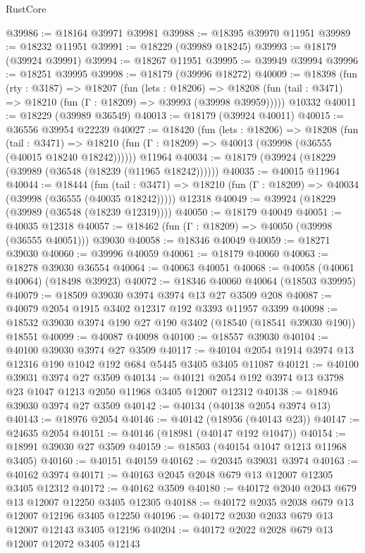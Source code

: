 \begin{lexlean}{RustCore}
\begin{coremodule}
@39986 := @18164 @39971 @39981
@39988 := @18395 @39970 @11951
@39989 := @18232 @11951
@39991 := @18229 (@39989 @18245)
@39993 := @18179 (@39924 @39991)
@39994 := @18267 @11951
@39995 := @39949 @39994
@39996 := @18251 @39995
@39998 := @18179 (@39996 @18272)
@40009 := @18398
    (fun (rty : @3187) =>
    @18207
      (fun (lets : @18206) =>
      @18208 (fun (tail : @3471) => @18210 (fun (Γ : @18209) => @39993 (@39998 @39959)))))
    @10332
@40011 := @18229 (@39989 @36549)
@40013 := @18179 (@39924 @40011)
@40015 := @36556 @39954 @22239
@40027 := @18420
    (fun (lets : @18206) =>
    @18208
      (fun (tail : @3471) =>
      @18210 (fun (Γ : @18209) => @40013 (@39998 (@36555 (@40015 @18240 @18242))))))
    @11964
@40034 := @18179 (@39924 (@18229 (@39989 (@36548 (@18239 (@11965 @18242))))))
@40035 := @40015 @11964
@40044 := @18444
    (fun (tail : @3471) => @18210 (fun (Γ : @18209) => @40034 (@39998 (@36555 (@40035 @18242)))))
    @12318
@40049 := @39924 (@18229 (@39989 (@36548 (@18239 @12319))))
@40050 := @18179 @40049
@40051 := @40035 @12318
@40057 := @18462 (fun (Γ : @18209) => @40050 (@39998 (@36555 @40051))) @39030
@40058 := @18346 @40049
@40059 := @18271 @39030
@40060 := @39996 @40059
@40061 := @18179 @40060
@40063 := @18278 @39030 @36554
@40064 := @40063 @40051
@40068 := @40058 (@40061 @40064) (@18498 @39923)
@40072 := @18346 @40060 @40064 (@18503 @39995)
@40079 := @18509 @39030 @3974 @3974 @13 @27 @3509 @208
@40087 := @40079 @2054 @1915 @3402 @12317 @192 @3393 @11957 @3399
@40098 := @18532 @39030 @3974 @190 @27 @190 @3402 (@18540 (@18541 @39030 @190)) @18551
@40099 := @40087 @40098
@40100 := @18557 @39030
@40104 := @40100 @39030 @3974 @27 @3509
@40117 := @40104 @2054 @1914 @3974 @13 @12316 @190 @1042 @192 @684 @5445 @3405 @3405 @11087
@40121 := @40100 @39031 @3974 @27 @3509
@40134 := @40121 @2054 @192 @3974 @13 @3798 @23 @1047 @1213 @2050 @11968 @3405 @12007 @12312
@40138 := @18946 @39030 @3974 @27 @3509
@40142 := @40134 (@40138 @2054 @3974 @13)
@40143 := @18976 @2054
@40146 := @40142 (@18956 (@40143 @23))
@40147 := @24635 @2054
@40151 := @40146 (@18981 (@40147 @192 @1047))
@40154 := @18991 @39030 @27 @3509
@40159 := @18503 (@40154 @1047 @1213 @11968 @3405)
@40160 := @40151 @40159
@40162 := @20345 @39031 @3974
@40163 := @40162 @3974
@40171 := @40163 @2045 @2048 @679 @13 @12007 @12305 @3405 @12312
@40172 := @40162 @3509
@40180 := @40172 @2040 @2043 @679 @13 @12007 @12250 @3405 @12305
@40188 := @40172 @2035 @2038 @679 @13 @12007 @12196 @3405 @12250
@40196 := @40172 @2030 @2033 @679 @13 @12007 @12143 @3405 @12196
@40204 := @40172 @2022 @2028 @679 @13 @12007 @12072 @3405 @12143

\end{coremodule}
\end{lexlean}
